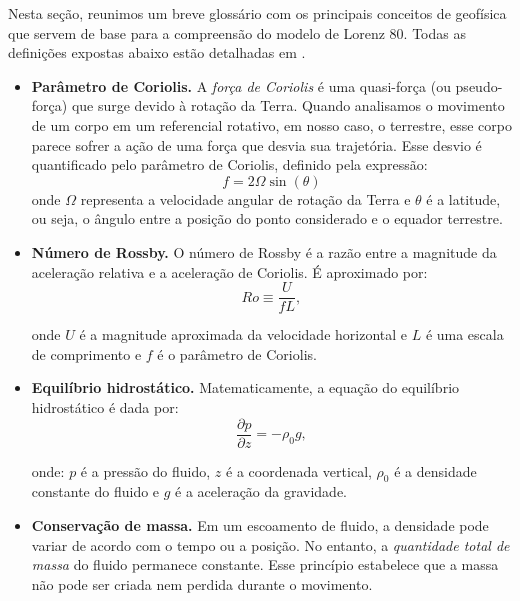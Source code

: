 Nesta seção, reunimos um breve glossário com os principais conceitos de geofísica que servem de base para a compreensão do modelo de Lorenz 80. Todas as definições expostas abaixo estão detalhadas em \citet{Vallis2017}.
\begin{itemize}
    \item \textbf{Parâmetro de Coriolis.} A \textit{força de Coriolis} é uma quasi-força (ou pseudo-força) que surge devido à rotação da Terra. Quando analisamos o movimento de um corpo em um referencial rotativo, em nosso caso, o terrestre, esse corpo parece sofrer a ação de uma força que desvia sua trajetória. Esse desvio é quantificado pelo parâmetro de Coriolis, definido pela expressão:
    \begin{equation*}
        f = 2 \Omega \sin(\theta)
    \end{equation*}
    onde $\Omega$ representa a velocidade angular de rotação da Terra e $\theta$ é a latitude, ou seja, o ângulo entre a posição do ponto considerado e o equador terrestre.

    \item \textbf{Número de Rossby.} O número de Rossby é a razão entre a magnitude da aceleração relativa e a aceleração de Coriolis. É aproximado por:
    \begin{equation*}
        Ro \equiv \frac{U}{fL},
    \end{equation*}

    onde $U$ é a magnitude aproximada da velocidade horizontal e $L$ é uma escala de comprimento e $f$ é o parâmetro de Coriolis.

    \item \textbf{Equilíbrio hidrostático.} Matematicamente, a equação do equilíbrio hidrostático é dada por:
    \begin{equation}
        \frac{\partial p}{\partial z} = - \rho_0g, \label{eq:equilibrio_hidrostatico}
    \end{equation}
    
    onde: $p$ é a pressão do fluido, $z$ é a coordenada vertical, $\rho_0$ é a densidade constante do fluido e $g$ é a aceleração da gravidade.
    \item \textbf{Conservação de massa.} Em um escoamento de fluido, a densidade pode variar de acordo com o tempo ou a posição. No entanto, a \textit{quantidade total de massa} do fluido permanece constante. Esse princípio estabelece que a massa não pode ser criada nem perdida durante o movimento.


\end{itemize}
